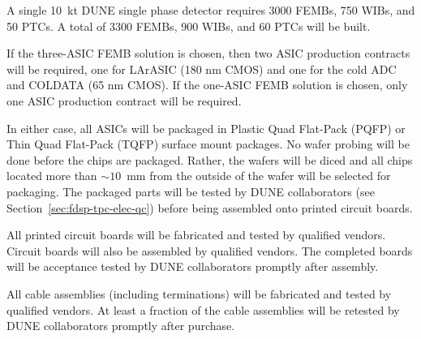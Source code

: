 A single 10~kt DUNE single phase detector requires 3000 FEMBs, 750 WIBs, and 50 PTCs.  A total of 3300 FEMBs, 900 WIBs, and 60 PTCs will be built.

If the three-ASIC FEMB solution is chosen, then two ASIC production contracts will be required, one for LArASIC (180 nm CMOS) and one for the cold ADC and COLDATA (65 nm CMOS).  If the one-ASIC FEMB solution is chosen, only one ASIC production contract will be required.

In either case, all ASICs will be packaged in Plastic Quad Flat-Pack (PQFP) or Thin Quad Flat-Pack (TQFP) surface mount packages.  No wafer probing will be done before the chips are packaged.  Rather, the wafers will be diced and all chips located more than $\sim10$~mm from the outside of the wafer will be selected for packaging.  The packaged parts will be tested by DUNE collaborators (see Section~\ref{sec:fdsp-tpc-elec-qc}) before being assembled onto printed circuit boards.

All printed circuit boards will be fabricated and tested by qualified vendors. Circuit boards will also be assembled by qualified vendors.  The completed boards will be acceptance tested by DUNE collaborators promptly after assembly.

All cable assemblies (including terminations) will be fabricated and tested by qualified vendors. At least a fraction of the cable assemblies will be retested by DUNE collaborators promptly after purchase.

